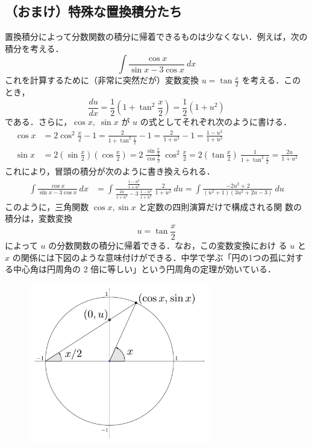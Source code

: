 \documentclass[10pt, uplatex, dvipdfmx]{jsarticle}
\theoremstyle{definition}
\numberwithin{equation}{section}
\newcommand{\ds}{\displaystyle}
\begin{document}
\newpage

\subsection{（おまけ）特殊な置換積分たち}

置換積分によって分数関数の積分に帰着できるものは少なくない．例えば，次の積分を考える．
\[
  \int \frac{\cos x}{\sin x - 3 \cos x} \ dx
\]
これを計算するために（非常に突然だが）変数変換 $\ds u=\tan\frac{x}{2}$ を考える．このとき，
\[
  \frac{du}{dx} = \frac{1}{2}\left( 1+ \tan^2\frac{x}{2}\right) = \frac{1}{2}(1+u^2)
\]
である．さらに，$\cos x, \; \sin x$ が $u$ の式としてそれぞれ次のように書ける．
\[
  \begin{aligned}
    \cos x &= 2\cos^2\frac{x}{2} - 1 = \frac{2}{1+\tan^2\frac{x}{2}} -1= \frac{2}{1+u^2}-1 =\frac{1-u^2}{1+u^2}\\[2ex]
    \sin x &= 2 \left( \sin\frac{x}{2}\right) \left(\cos\frac{x}{2}\right)
             = 2~ \frac{\sin \frac{x}{2}}{\cos \frac{x}{2}}~ \cos^2 \frac{x}{2}
             = 2 \left(\tan \frac{x}{2}\right)~ \frac{1}{1+\tan^2\frac{x}{2}}
             = \frac{2u}{1+u^2}
  \end{aligned}
\]
これにより，冒頭の積分が次のように書き換えられる．
\[
  \begin{aligned}
    \int \frac{\cos x}{ \sin x - 3 \cos x} \ dx
    &= \int \frac{ \frac{1-u^2}{1+u^2}}{ \frac{2u}{1+u^2} - 3~\frac{1-u^2}{1+u^2}}~ \frac{2}{1+u^2} \ du
      = \int \frac{-2u^2+2}{(u^2+1)(3u^2+2u-3)} \ du
  \end{aligned}
\]
このように，三角関数 $\cos x, \sin x$ と定数の四則演算だけで構成される関
数の積分は，変数変換
\[
  u=\tan\frac{x}{2}
\]
によって $u$ の分数関数の積分に帰着できる．なお，この変数変換におけ
る $u$ と $x$ の関係には下図のような意味付けができる．中学で学ぶ「円の1つの孤に対する中心角は円周角の $2$ 倍に等しい」という円周角の定理が効いている．
\begin{figure}[h]
  \centering
  \includegraphics[height=7cm]{./pictures/03/u-tanx2.pdf}
\end{figure}
\end{document}
